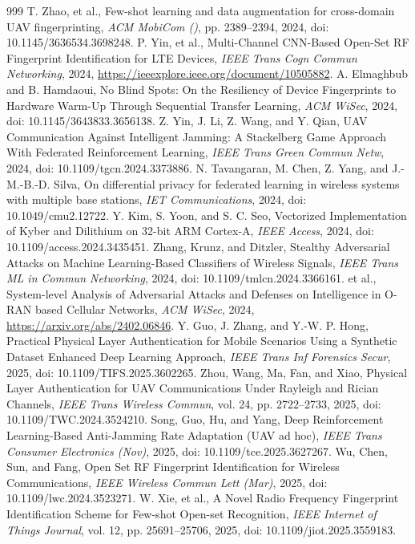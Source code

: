 \documentclass[10.5pt,compsoc,winfonts]{ICN}
\begin{document}
\begin{thebibliography}{999}
T. Zhao, et al., Few-shot learning and data augmentation for cross-domain UAV fingerprinting, \emph{ACM MobiCom ()}, pp. 2389–2394, 2024, doi: 10.1145/3636534.3698248.
P. Yin, et al., Multi-Channel CNN-Based Open-Set RF Fingerprint Identification for LTE Devices, \emph{IEEE Trans Cogn Commun Networking}, 2024, \url{https://ieeexplore.ieee.org/document/10505882}.
A. Elmaghbub and B. Hamdaoui, No Blind Spots: On the Resiliency of Device Fingerprints to Hardware Warm-Up Through Sequential Transfer Learning, \emph{ACM WiSec}, 2024, doi: 10.1145/3643833.3656138.
Z. Yin, J. Li, Z. Wang, and Y. Qian, UAV Communication Against Intelligent Jamming: A Stackelberg Game Approach With Federated Reinforcement Learning, \emph{IEEE Trans Green Commun Netw}, 2024, doi: 10.1109/tgcn.2024.3373886.
N. Tavangaran, M. Chen, Z. Yang, and J.-M.-B.-D. Silva, On differential privacy for federated learning in wireless systems with multiple base stations, \emph{IET Communications}, 2024, doi: 10.1049/cmu2.12722.
Y. Kim, S. Yoon, and S. C. Seo, Vectorized Implementation of Kyber and Dilithium on 32-bit ARM Cortex-A, \emph{IEEE Access}, 2024, doi: 10.1109/access.2024.3435451.
Zhang, Krunz, and Ditzler, Stealthy Adversarial Attacks on Machine Learning-Based Classifiers of Wireless Signals, \emph{IEEE Trans ML in Commun Networking}, 2024, doi: 10.1109/tmlcn.2024.3366161.
et al., System-level Analysis of Adversarial Attacks and Defenses on Intelligence in O-RAN based Cellular Networks, \emph{ACM WiSec}, 2024, \url{https://arxiv.org/abs/2402.06846}.
Y. Guo, J. Zhang, and Y.-W. P. Hong, Practical Physical Layer Authentication for Mobile Scenarios Using a Synthetic Dataset Enhanced Deep Learning Approach, \emph{IEEE Trans Inf Forensics Secur}, 2025, doi: 10.1109/TIFS.2025.3602265.
Zhou, Wang, Ma, Fan, and Xiao, Physical Layer Authentication for UAV Communications Under Rayleigh and Rician Channels, \emph{IEEE Trans Wireless Commun}, vol. 24, pp. 2722–2733, 2025, doi: 10.1109/TWC.2024.3524210.
Song, Guo, Hu, and Yang, Deep Reinforcement Learning-Based Anti-Jamming Rate Adaptation (UAV ad hoc), \emph{IEEE Trans Consumer Electronics (Nov)}, 2025, doi: 10.1109/tce.2025.3627267.
Wu, Chen, Sun, and Fang, Open Set RF Fingerprint Identification for Wireless Communications, \emph{IEEE Wireless Commun Lett (Mar)}, 2025, doi: 10.1109/lwc.2024.3523271.
W. Xie, et al., A Novel Radio Frequency Fingerprint Identification Scheme for Few-shot Open-set Recognition, \emph{IEEE Internet of Things Journal}, vol. 12, pp. 25691–25706, 2025, doi: 10.1109/jiot.2025.3559183.

\end{thebibliography}
\end{document}
